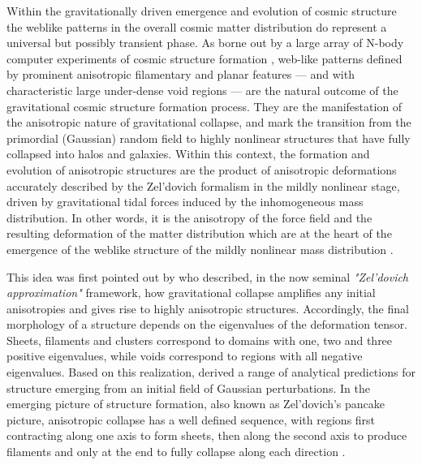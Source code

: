 Within the gravitationally driven emergence and evolution of cosmic structure the weblike patterns in the overall cosmic matter 
distribution do represent a universal but possibly transient phase. As borne out by a large array of N-body computer experiments 
of cosmic structure formation \citep[e.g.][]{Springel2005c, Vogelsberger2014,Schaye2015}, web-like patterns 
defined by prominent anisotropic filamentary and planar features --- and with characteristic large under-dense void regions --- are the 
natural outcome of the gravitational cosmic structure formation process. They are the manifestation of the anisotropic nature of gravitational 
collapse, and mark the transition from the primordial (Gaussian) random field to highly nonlinear structures that have fully collapsed into halos 
and galaxies. 
Within this context, the formation and evolution of anisotropic structures are the product of anisotropic deformations accurately described by the Zel'dovich formalism in the mildly nonlinear stage, driven by gravitational tidal forces induced by the inhomogeneous mass distribution.
%
 In other words, it is the anisotropy of the force field and the resulting deformation of 
the matter distribution which are at the heart of the emergence of the weblike structure of the mildly nonlinear mass distribution \citep[also see][]{Bond1996}.

This idea was first pointed out by \citet[][also see \citealt{Shandarin1989}]{Zeldovich1970} who described, in the now seminal \emph{"Zel'dovich approximation"} framework, how gravitational collapse amplifies any initial anisotropies and gives rise to 
highly anisotropic structures. Accordingly, the final morphology of a structure depends on 
the eigenvalues of the deformation tensor.  Sheets, filaments and clusters correspond to domains with one, two and three positive 
eigenvalues, while voids correspond to regions with all negative eigenvalues. Based on this realization, \cite{Doroshkevich1970} derived 
a range of analytical predictions for structure emerging from an initial field of Gaussian perturbations. In the emerging picture of 
structure formation, also known as Zel'dovich's pancake picture, anisotropic collapse has a well defined sequence, with regions first 
contracting along one axis to form sheets, then along the second axis to produce filaments and only at the end to fully collapse along 
each direction \citep{Shandarin1989,Shandarin2009}. 

